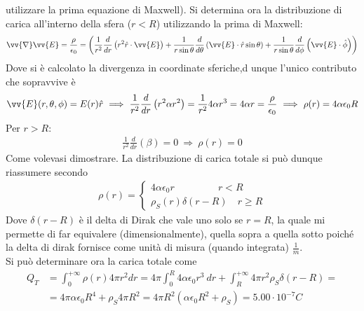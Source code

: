 \documentclass[a4paper, oneside]{article}
\begin{document}
\begin{example}
    utilizzare la prima equazione di Maxwell). Si determina ora la distribuzione di carica all'interno della sfera ($r < R$)
    utilizzando la prima di Maxwell:
    \begin{gather*}
        \vv{\nabla}\vv{E} = \frac{\rho}{\epsilon_0} = \left(\frac{1}{r^{2}} \frac{d}{dr} \left(r^{2} \hat{r} \cdot  \vv{E}  \right) + \frac{1}{r\sin\theta } \frac{d}{d\theta} \left(\vv{E} \cdot \hat{r} \sin\theta  \right) + \frac{1}{r\sin\theta} \frac{d}{d\phi} \left(\vv{E} \cdot \hat{\phi}  \right)\right)  
    \end{gather*}
    Dove si è calcolato la divergenza in coordinate sferiche,d unque l'unico contributo che sopravvive è
    \begin{gather*}
        \vv{E}(r, \theta, \phi) = E(r) \hat{r} \ \Longrightarrow \ \frac{1}{r^{2}} \frac{d}{dr} \left(r^{2} \alpha r^{2} \right) = \frac{1}{r^{2}} 4\alpha r^{3} = 4\alpha r  = \frac{\rho}{ \epsilon_0} \ \Longrightarrow \ \rho(r) = 4\alpha\epsilon_0 R
    \end{gather*}
    Per $r > R$:
    \begin{gather*}
        \frac{1}{r^{2}} \frac{d}{dr} \left(\beta\right) = 0  \ \Longrightarrow \ \rho(r) = 0
    \end{gather*}
    Come volevasi dimostrare. La distribuzione di carica totale si può dunque riassumere secondo 
    \begin{gather*}
        \rho(r) = \left\{\begin{array}{l}
            4\alpha \epsilon_0 r \qquad \qquad \ \  r < R \\
            \rho_S(r) \delta(r - R) \quad r \geq R
        \end{array}\right.
    \end{gather*}
    Dove $\delta(r - R)$ è il delta di Dirak che vale uno solo se $r = R$, la quale mi permette di 
    far equivalere (dimensionalmente), quella sopra a quella sotto poiché la delta di dirak 
    fornisce come unità di misura (quando integrata) $\frac{1}{m}$.\\
    Si può determinare ora la carica totale come 
    \begin{align*}
        Q_T &= \int_{0}^{+\infty } \rho(r) 4\pi r^{2} dr = 4\pi \int_{0}^{R} 4\alpha \epsilon_0 r^{3} \ dr + \int_{R}^{+ \infty } 4\pi r^{2} \rho_S \delta (r - R)  = \\
         &= 4\pi \alpha \epsilon_0 R^{4} +  \rho_S 4\pi R^{2} = 4\pi R^{2} (\alpha \epsilon_0 R^{2} + \rho_S) = 5.00 \cdot 10^{-7} C
    \end{align*}

\end{example}
\end{document}
